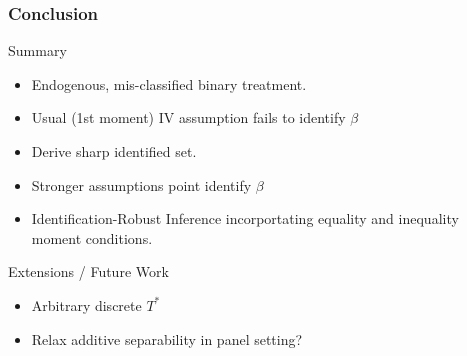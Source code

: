 \documentclass{beamer}
\begin{document}
\begin{frame}
  \frametitle{Conclusion}

  \begin{block}{Summary}
  \begin{itemize}
    \item Endogenous, mis-classified binary treatment.
      \item Usual (1st moment) IV assumption fails to identify $\beta$
    \item Derive sharp identified set.
      \item Stronger assumptions point identify $\beta$
      \item Identification-Robust Inference incorportating equality and inequality moment conditions.
   \end{itemize}
 \end{block}

 \begin{block}{Extensions / Future Work}
   \begin{itemize}
 \item Arbitrary discrete $T^*$
 \item Relax additive separability in panel setting?
 \end{itemize}
 \end{block}

\end{frame}
\appendix
\end{document}
